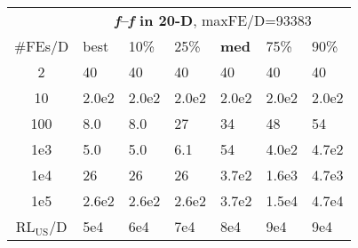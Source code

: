 \begin{tabular}{c|llllll}
 & \multicolumn{6}{|c}{\textbf{\textit{f}\raisebox{-0.35ex}{1}--\textit{f}\raisebox{-0.35ex}{5} in 20-D}, maxFE/D=93383}\\
\#FEs/D & best & 10\% & 25\% & \textbf{med} & 75\% & 90\%\\
2 & 40 & 40 & 40 & 40 & 40 & 40\\
10 & 2.0e2 & 2.0e2 & 2.0e2 & 2.0e2 & 2.0e2 & 2.0e2\\
100 & \hspace*{1ex}8.0 & \hspace*{1ex}8.0 & 27 & 34 & 48 & 54\\
1e3 & \hspace*{1ex}5.0 & \hspace*{1ex}5.0 & \hspace*{1ex}6.1 & 54 & 4.0e2 & 4.7e2\\
1e4 & 26 & 26 & 26 & 3.7e2 & 1.6e3 & 4.7e3\\
1e5 & 2.6e2 & 2.6e2 & 2.6e2 & 3.7e2 & 1.5e4 & 4.7e4\\
$\text{RL}_{\text{US}}$/D & 5e4 & 6e4 & 7e4 & 8e4 & 9e4 & 9e4
\end{tabular}
